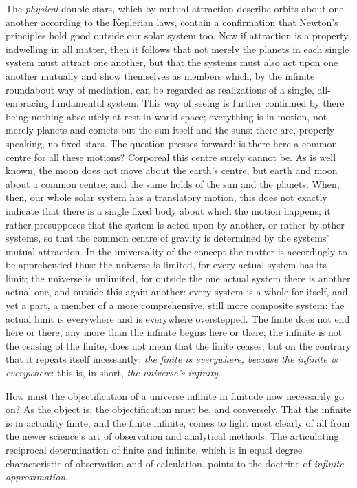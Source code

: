 \documentclass[12pt,a4paper]{book}
\begin{document}
The \emph{physical} double stars, which by mutual attraction describe orbits about one another according to
the Keplerian laws, contain a confirmation that Newton's principles
hold good outside our solar system too. Now if attraction is a property indwelling in all matter, then it
follows that not merely the planets in each single system must attract one another, but that the systems must
also act upon one another mutually and show themselves as members which, by the infinite roundabout way of
mediation, can be regarded as realizations of a single, all-embracing fundamental system. This way of seeing
is further confirmed by there being nothing absolutely at rest in world-space; everything is in motion, not
merely planets and comets but the sun itself and the suns: there are, properly speaking, no fixed stars. The
question presses forward: is there here a common centre for all these motions? Corporeal this centre surely
cannot be. As is well known, the moon does not move about the earth's centre, but earth and moon about a
common centre; and the same holds of the sun and the planets. When, then, our whole solar system has a
translatory motion, this does not exactly indicate that there is a single fixed body about which the motion
happens; it rather presupposes that the system is acted upon by another, or rather by other systems, so that
the common centre of gravity is determined by the systems' mutual attraction. In the universality of the
concept the matter is accordingly to be apprehended thus: the universe is limited, for every actual system
has its limit; the universe is unlimited, for outside the one actual system there is another actual one, and
outside this again another: every system is a whole for itself, and yet a part, a member of a more
comprehensive, still more composite system: the actual limit is everywhere and is everywhere overstepped. The
finite does not end here or there, any more than the infinite begins here or there; the infinite is not the
ceasing of the finite, does not mean that the finite ceases,
but on the contrary that it repeats itself incessantly; \emph{the finite is
everywhere, because the infinite is everywhere}: this is, in short, \emph{the universe's infinity}.

How must the objectification of a universe infinite in finitude now necessarily go on? As the object is, the
objectification must be, and conversely. That the infinite is in actuality finite, and the finite infinite,
comes to light most clearly of all from the newer science's art of observation and analytical methods. The
articulating reciprocal determination of finite and infinite, which is in equal degree characteristic of
observation and of calculation, points to the doctrine of \emph{infinite approximation}.
\end{document}
